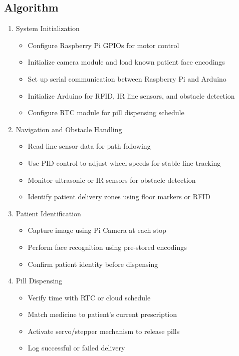 \subsection{Algorithm}
\begin{enumerate}
    \item System Initialization
    \begin{itemize}
        \item Configure Raspberry Pi GPIOs for motor control
        \item Initialize camera module and load known patient face encodings
        \item Set up serial communication between Raspberry Pi and Arduino
        \item Initialize Arduino for RFID, IR line sensors, and obstacle detection
        \item Configure RTC module for pill dispensing schedule
    \end{itemize}

    \item Navigation and Obstacle Handling
    \begin{itemize}
        \item Read line sensor data for path following
        \item Use PID control to adjust wheel speeds for stable line tracking
        \item Monitor ultrasonic or IR sensors for obstacle detection
        \item Identify patient delivery zones using floor markers or RFID
    \end{itemize}

    \item Patient Identification
    \begin{itemize}
        \item Capture image using Pi Camera at each stop
        \item Perform face recognition using pre-stored encodings
        \item Confirm patient identity before dispensing
    \end{itemize}

    \item Pill Dispensing
    \begin{itemize}
        \item Verify time with RTC or cloud schedule
        \item Match medicine to patient's current prescription
        \item Activate servo/stepper mechanism to release pills
        \item Log successful or failed delivery
    \end{itemize}


\end{enumerate}
